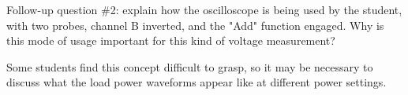 \vskip 10pt

Follow-up question \#2: explain how the oscilloscope is being used by the student, with two probes, channel B inverted, and the "Add" function engaged.  Why is this mode of usage important for this kind of voltage measurement?







Some students find this concept difficult to grasp, so it may be necessary to discuss what the load power waveforms appear like at different power settings.





